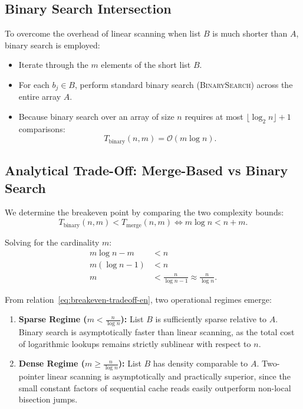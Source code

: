 \subsection{Binary Search Intersection}
To overcome the overhead of linear scanning when list $B$ is much shorter than $A$, binary search is employed:
\begin{itemize}
  \item Iterate through the $m$ elements of the short list $B$.
  \item For each $b_j \in B$, perform standard binary search (\textsc{BinarySearch}) across the entire array $A$.
  \item Because binary search over an array of size $n$ requires at most $\lfloor \log_2 n \rfloor + 1$ comparisons:
  \begin{equation}
    T_{\text{binary}}(n, m) = \mathcal{O}(m \log n).
  \end{equation}
\end{itemize}

\subsection{Analytical Trade-Off: Merge-Based vs Binary Search}
We determine the breakeven point by comparing the two complexity bounds:
\begin{equation}
  T_{\text{binary}}(n, m) < T_{\text{merge}}(n, m) \iff m \log n < n + m.
\end{equation}

Solving for the cardinality $m$:
\begin{align}
  m \log n - m &< n \nonumber \\
  m (\log n - 1) &< n \nonumber \\
  m &< \frac{n}{\log n - 1} \approx \frac{n}{\log n}.
  \label{eq:breakeven-tradeoff-en}
\end{align}

\begin{corollary}
From relation~\eqref{eq:breakeven-tradeoff-en}, two operational regimes emerge:
\begin{enumerate}
  \item \textbf{Sparse Regime ($m < \frac{n}{\log n}$):} List $B$ is sufficiently sparse relative to $A$. Binary search is asymptotically faster than linear scanning, as the total cost of logarithmic lookups remains strictly sublinear with respect to $n$.
  \item \textbf{Dense Regime ($m \ge \frac{n}{\log n}$):} List $B$ has density comparable to $A$. Two-pointer linear scanning is asymptotically and practically superior, since the small constant factors of sequential cache reads easily outperform non-local bisection jumps.
\end{enumerate}
\end{corollary}

